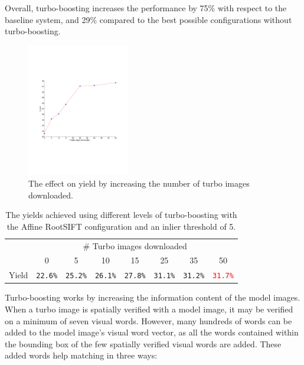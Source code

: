 \documentclass[11pt, onecolumn, a4paper, final]{report} %
\begin{document}
Overall, turbo-boosting increases the performance by 75\% with respect to the baseline system, and 29\% compared to the best possible configurations without turbo-boosting.

\begin{figure}[hbtp]
\centering 
\includegraphics[width=0.4\textwidth]{images/turbograph.pdf}
\caption{The effect on yield by increasing the number of turbo images downloaded.}
\label{fig:turbograph}
\end{figure}

\begin{table}[hbtp]
\begin{center}
\begin{tabular}{c|c|c|c|c|c|c|c|}
\cline{2-8}
 & \multicolumn{7}{|c|}{\# Turbo images downloaded} \\ 
 \cline{2-8}
 & 0 & 5 & 10 & 15 & 25 & 35 & 50 \\
 \cline{2-8}
 \cline{1-8}
\multicolumn{1}{|c||}{Yield} & \texttt{22.6\%} & \texttt{25.2\%} & \texttt{26.1\%} & \texttt{27.8\%} & \texttt{31.1\%} & \texttt{31.2\%} & \textcolor{red}{\texttt{31.7\%}}\\
\cline{1-8}
\end{tabular}
\end{center}
\caption{The yields achieved using different levels of turbo-boosting with the Affine RootSIFT configuration and an inlier threshold of 5.}
\label{tbl:turboresults}
\end{table}
 

Turbo-boosting works by increasing the information content of the model images. When a turbo image is spatially verified with a model image, it may be verified on a minimum of seven visual words. However, many hundreds of words can be added to the model image's visual word vector, as all the words contained within the bounding box of the few spatially verified visual words are added. These added words help matching in three ways:
\end{document}
